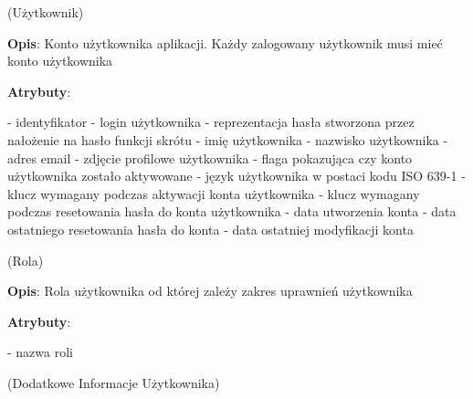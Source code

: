 \begin{enumerate}[label={\textbf{KAT/\protect\threedigits{\theenumi}}}, wide, labelwidth=!, labelindent=0pt, labelsep=0pt, series=reqs]
    \setlength\itemsep{1em}
     \label{kat:User} (Użytkownik)

    \textbf{Opis}: Konto użytkownika aplikacji. Każdy zalogowany użytkownik musi mieć konto użytkownika
    \par
    \textbf{Atrybuty}:
    \begin{itemize}[series=atr, wide, align=left, leftmargin=190pt]
         \label{kat:User:id} - identyfikator
         \label{kat:User:login} - login użytkownika
         \label{kat:User:passwordHash} - reprezentacja hasła stworzona przez nałożenie na hasło funkcji skrótu
         \label{kat:User:firstName} - imię użytkownika
         \label{kat:User:lastName} - nazwisko użytkownika
         \label{kat:User:email} - adres email
         \label{kat:User:image} - zdjęcie profilowe użytkownika
         \label{kat:User:activated} - flaga pokazująca czy konto użytkownika zostało aktywowane
         \label{kat:User:language} - język użytkownika w postaci kodu ISO 639-1
         \label{kat:User:activationKey} - klucz wymagany podczas aktywacji konta użytkownika
         \label{kat:User:resetKey} - klucz wymagany podczas resetowania hasła do konta użytkownika
         \label{kat:User:createdDate} - data utworzenia konta
         \label{kat:User:resetDate} - data ostatniego resetowania hasła do konta
         \label{kat:User:lastModifiedDate} - data ostatniej modyfikacji konta
    \end{itemize}

     \label{kat:Authority} (Rola)

    \textbf{Opis}: Rola użytkownika od której zależy zakres uprawnień użytkownika
    \par
    \textbf{Atrybuty}:
    \begin{itemize}[series=atr, wide, align=left, leftmargin=190pt]
         \label{kat:Authority:name} - nazwa roli
    \end{itemize}

     \label{kat:UserExtraInfo} (Dodatkowe Informacje Użytkownika)


\end{enumerate}

